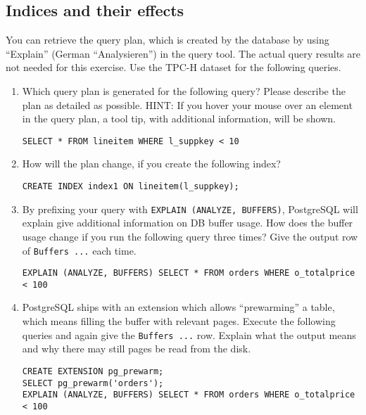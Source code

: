 \subsection*{Indices and their effects}
You can retrieve the query plan, which is created by the database by using ``Explain'' (German ``Analysieren'') in the query tool.
The actual query results are not needed for this exercise.
Use the TPC-H dataset for the following queries.

\begin{enumerate}
  \item Which query plan is generated for the following query?
        Please describe the plan as detailed as possible.
        HINT: If you hover your mouse over an element in the query plan, a tool tip, with additional information, will be shown.

        \begin{verbatim}
SELECT * FROM lineitem WHERE l_suppkey < 10
\end{verbatim}

  \item How will the plan change, if you create the following index?

        \begin{verbatim}
CREATE INDEX index1 ON lineitem(l_suppkey);
\end{verbatim}

  \item By prefixing your query with \verb+EXPLAIN (ANALYZE, BUFFERS)+, PostgreSQL will explain give additional information on DB buffer usage.
        How does the buffer usage change if you run the following query three times?
        Give the output row of \verb+Buffers ...+ each time.

        \begin{verbatim}
EXPLAIN (ANALYZE, BUFFERS) SELECT * FROM orders WHERE o_totalprice < 100
\end{verbatim}

  \item PostgreSQL ships with an extension which allows ``prewarming'' a table, which means filling the buffer with relevant pages.
        Execute the following queries and again give the \verb+Buffers ...+ row.
        Explain what the output means and why there may still pages be read from the disk.

        \begin{verbatim}
CREATE EXTENSION pg_prewarm;
SELECT pg_prewarm('orders');
EXPLAIN (ANALYZE, BUFFERS) SELECT * FROM orders WHERE o_totalprice < 100
\end{verbatim}

\end{enumerate}


